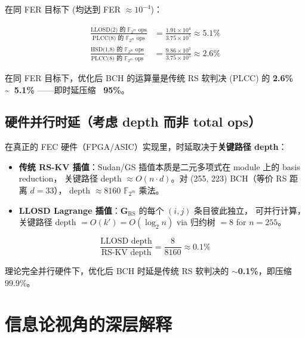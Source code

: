 \documentclass[11pt,a4paper]{article}
\begin{document}
在同 FER 目标下 (均达到 FER $\approx 10^{-4}$)：

\begin{align}
\frac{\text{LLOSD(2) 的 } \mathbb{F}_{2^m}\text{ ops}}{\text{PLCC(8) 的 } \mathbb{F}_{2^m}\text{ ops}}
&= \frac{1.91\times 10^4}{3.75\times 10^5} \approx \boxed{5.1\%} \\
\frac{\text{HSD(1,8) 的 } \mathbb{F}_{2^m}\text{ ops}}{\text{PLCC(8) 的 } \mathbb{F}_{2^m}\text{ ops}}
&= \frac{9.86\times 10^3}{3.75\times 10^5} \approx \boxed{2.6\%}
\end{align}

\begin{concludebox}[title=\textbf{结论 A（工程实测）}]
在同 FER 目标下，优化后 BCH 的运算量是传统 RS 软判决 (PLCC) 的 \textbf{2.6\% \textasciitilde\ 5.1\%}
——即时延压缩 \textbf{~95\%}。
\end{concludebox}

\subsection{硬件并行时延（考虑 depth 而非 total ops）}

在真正的 FEC 硬件（FPGA/ASIC）实现里，时延取决于\textbf{关键路径 depth}：

\begin{itemize}
\item \textbf{传统 RS-KV 插值}：Sudan/GS 插值本质是二元多项式在 module 上的 basis reduction，
关键路径 depth $\approx O(n\cdot d)$。对 (255, 223) BCH（等价 RS 距离 $d=33$），
depth $\approx 8160$ $\mathbb{F}_{2^m}$ 乘法。

\item \textbf{LLOSD Lagrange 插值}：$\mathbf{G}_{\text{RS}}$ 的每个 $(i,j)$ 条目彼此独立，
可并行计算，关键路径 depth $= O(k') = O(\log_2 n)$ via 归约树 $= 8$ for $n=255$。
\end{itemize}

\begin{equation}
\boxed{\frac{\text{LLOSD depth}}{\text{RS-KV depth}} = \frac{8}{8160} \approx 0.1\%}
\end{equation}

\begin{concludebox}[title=\textbf{结论 B（硬件并行架构）}]
理论完全并行硬件下，优化后 BCH 时延是传统 RS 软判决的 \textbf{$\sim$0.1\%}，即压缩 99.9\%。
\end{concludebox}

\section{信息论视角的深层解释}
\end{document}
